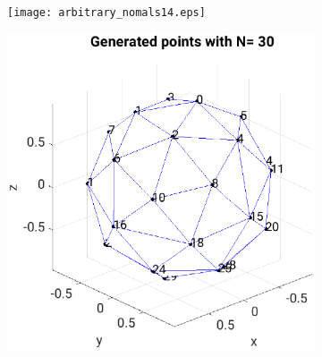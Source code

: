 \begin{figure}[H]
     \centering
     \begin{subfigure}[b]{0.48\textwidth}
         \centering
        \texttt{[image: arbitrary\_nomals14.eps]}
         \label{fig:arbitary_n14}
     \end{subfigure}
     \hfill
     \begin{subfigure}[b]{0.48\textwidth}
         \centering
         \includegraphics[width=1.2\textwidth]{Graphics/arbitrary_nomals30.eps}
         \label{fig:arbitary_n30}
     \end{subfigure}
         \hfill
     \begin{subfigure}[b]{0.48\textwidth}
         \centering

\end{subfigure}
\end{figure}
